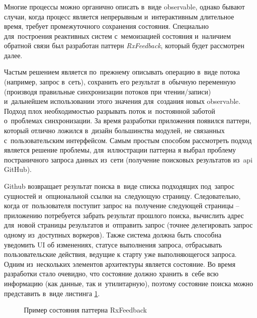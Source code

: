\subsubsection{}
\label{sec:development:arch:ios:rxfeedback}

Многие процессы можно органично описать в~виде \gls{observable}, однако бывают случаи, когда процесс является непрерывным и~интерактивным длительное время, требует промежуточного сохранения состояния. Специально для~построения реактивных систем с~мемоизацией состояния и~наличием обратной связи был разработан паттерн \emph{RxFeedback}, который будет рассмотрен далее.

Частым решением является по~прежнему описывать операцию в~виде потока (например, запрос в~сеть), сохранить его результат в~обычную переменную (производя правильные синхронизации потоков при чтении/записи) и~дальнейшем использовании этого значения для~создания новых \gls{observable}. Подход плох необходимостью разрывать поток и~постоянной заботой о~проблемах синхронизации. За время разработки приложения появился паттерн, который отлично ложился в~дизайн большинства модулей, не связанных с~пользовательским интерфейсом.
Самым простым способом рассмотреть подход является решение проблемы, для~иллюстрации паттерна я выбрал проблему постраничного запроса данных из~сети (получение поисковых результатов из~\gls{api} GitHub).

Github возвращает результат поиска в~виде списка подходящих под~запрос сущностей и~опциональной ссылки на~следующую страницу. Следовательно, когда от~пользователя поступит запрос на~получение следующей страницы -- приложению потребуется забрать результат прошлого поиска, вычислить адрес для~новой страницы результатов и~отправить запрос (точнее делегировать запрос одному из~доступных воркеров). Также система должна быть способна уведомить UI об изменениях, статусе выполнения запроса, отбрасывать пользовательские действия, ведущие к старту уже выполняющегося запроса.
Одним из~нескольких элементов архитектуры является состояние. Во время разработки стало очевидно, что состояние должно хранить в~себе всю информацию (как данные, так и~утилитарную), поэтому состояние поиска можно представить в~виде листинга \ref{sec:development:arch:ios:rxfeedback:example:state}.

\begin{figure}[h]
  
   \caption{Пример состояния паттерна RxFeedback}
   \label{sec:development:arch:ios:rxfeedback:example:state}
\end{figure}

